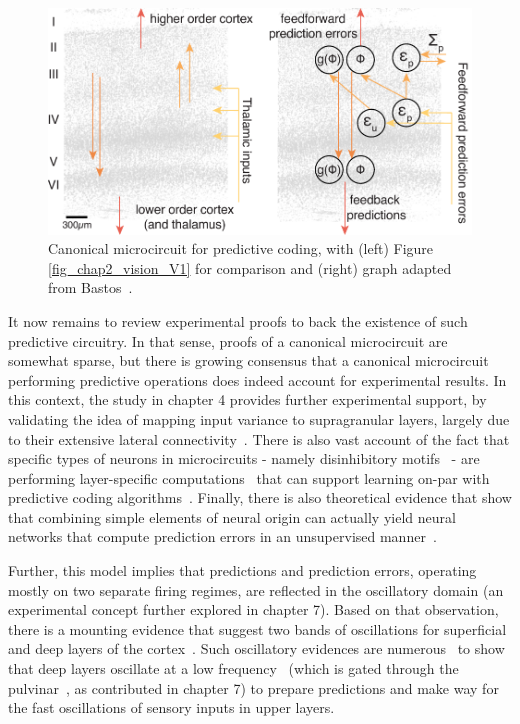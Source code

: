 \begin{figure}[h!tbp]
\vspace{0.1cm}
\centering
\includegraphics[width=1.\textwidth]{fig/chap2_fig_microcircuit.pdf}
\caption[Canonical microcircuit for predictive coding.]{Canonical microcircuit for predictive coding, with (left) Figure \ref{fig_chap2_vision_V1} for comparison and (right) graph adapted from Bastos~\cite{bastos2012canonical}.}
\label{fig_chap2_microcircuit}
\end{figure}

It now remains to review experimental proofs to back the existence of such predictive circuitry. In that sense, proofs of a canonical microcircuit are somewhat sparse, but there is growing consensus that a canonical microcircuit performing predictive operations does indeed account for experimental results. In this context, the study in chapter 4 provides further experimental support, by validating the idea of mapping input variance to supragranular layers, largely due to their extensive lateral connectivity~\cite{angelucci2002circuits,chavane2022revisiting, adesnik2010lateral}. There is also vast account of the fact that specific types of neurons in microcircuits - namely disinhibitory motifs~\cite{kuhlman2013disinhibitory, naka2016inhibitory} - are performing layer-specific computations~\cite{bugeon2022transcriptomic} that can support learning on-par with predictive coding algorithms~\cite{sacramento2018dendritic}.
Finally, there is also theoretical evidence that show that combining simple elements of neural origin can actually yield neural networks that compute prediction errors in an unsupervised manner~\cite{boerlin2013predictive, hertag2022prediction}.

Further, this model implies that predictions and prediction errors, operating mostly on two separate firing regimes, are reflected in the oscillatory domain (an experimental concept further explored in chapter 7). Based on that observation, there is a mounting evidence that suggest two bands of oscillations for superficial and deep layers of the cortex~\cite{bastos2015visual}. Such oscillatory evidences are numerous~\cite{nikolic2013gamma, schmiedt2014beta, engel2001dynamic, engel2010beta} to show that deep layers oscillate at a low frequency~\cite{bastos2020layer} (which is gated through the pulvinar~\cite{cortes2021corticothalamic}, as contributed in chapter 7) to prepare predictions and make way for the fast oscillations of sensory inputs in upper layers.

